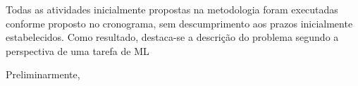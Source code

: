 Todas as atividades inicialmente propostas na metodologia foram executadas conforme proposto no cronograma, sem descumprimento aos prazos inicialmente estabelecidos. Como resultado, destaca-se a descrição do problema segundo a perspectiva de uma tarefa de ML

Preliminarmente,


